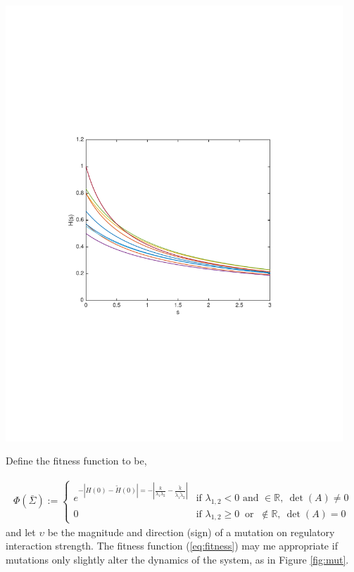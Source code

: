 \documentclass[11 pt]{article}
\begin{document}
  \begin{minipage}{0.5\textwidth}
    \centering
    \includegraphics[width=0.95\textwidth]{figure_2x2mutation01}%
      \label{fig:mut}%
  \end{minipage}


Define the fitness function to be,

\begin{align}\label{eq:fitness}
  \Phi(\bar{\Sigma}) := \left\{ \begin{array}{ll}   e^{- \left| H(0) - \tilde{H}(0) \right| = - \left| \frac{k}{\lambda_{1} \lambda_{2}} - \frac{\tilde{k}}{\tilde{\lambda}_{1} \tilde{\lambda}_{2}} \right|}    &\text{if } \lambda_{1,2} < 0 \text{ and } \in \mathbb{R}, \ \det(A) \neq 0 \\
  0   &\text{if } \lambda_{1,2} \geq 0 \ \text{ or } \ \notin \mathbb{R}, \ \det(A) = 0 \end{array} \right.
\end{align}
and let $\upsilon$ be the magnitude and direction (sign) of a mutation on regulatory interaction strength. The fitness function (\ref{eq:fitness}) may me appropriate if mutations only slightly alter the dynamics of the system, as in Figure \ref{fig:mut}.
\end{document}

